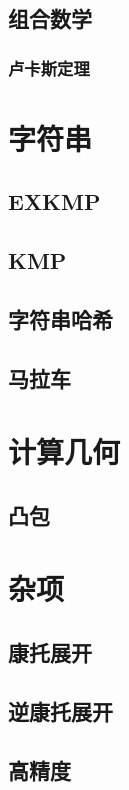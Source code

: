 \documentclass{article}
\begin{document}
\begin{multicols*}{3}
\subsection{组合数学}
\subsubsection{卢卡斯定理}


\section{字符串}
\subsection{EXKMP}


\subsection{KMP}


\subsection{字符串哈希}


\subsection{马拉车}


\section{计算几何}
\subsection{凸包}


\section{杂项}
\subsection{康托展开}


\subsection{逆康托展开}


\subsection{高精度}


\end{multicols*}
\end{document}
